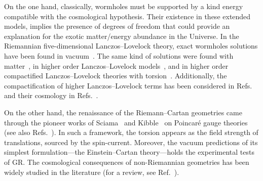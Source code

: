 \documentclass[aps,prd,12pt,superscriptaddress,showpacs,showkeys,longbibliography,reprint,nofootinbib]{revtex4-1}
\begin{document}
On the one hand, classically, wormholes must be supported by a kind energy compatible with the cosmological hypothesis. Their existence in these extended models, implies the presence of degrees of freedom that could provide an explanation for the exotic matter/energy abundance in the Universe. In the Riemannian five-dimensional Lanczos--Lovelock theory, exact wormholes solutions have been found in vacuum~\cite{Dotti:2006cp,Dotti:2007az}. The same kind of solutions were found with matter~\cite{Mehdizadeh:2015jra}, in higher order Lanczos--Lovelock models~\cite{Mehdizadeh:2015dta}, and in higher order compactified Lanczos--Lovelock theories with torsion~\cite{Canfora:2008ka}. Additionally, the compactification of higher Lanczos--Lovelock terms has been considered in Refs.~\cite{MuellerHoissen:1985mm,MuellerHoissen:1989yv} and their cosmology in Refs.~\cite{MuellerHoissen:1985ij,Deruelle:1986iv,Deruelle:1989fj}.  

On the other hand, the renaissance of the Riemann--Cartan geometries came through the pioneer works of Sciama~\cite{Sciama:1962} and Kibble~\cite{Kibble:1961ba} on Poincar\'e gauge theories (see also Refs.~\cite{Hehl:1976kj,Blagojevic:2002du}). In such a framework, the torsion appears as the field strength of translations, sourced by the spin-current.
Moreover, the vacuum predictions of its simplest formulation---the Einstein--Cartan theory---holds the experimental tests of GR. The cosmological consequences of non-Riemannian geometries has been widely studied in the literature (for a review, see Ref.~\cite{Puetzfeld:2004yg}). %
\end{document}
